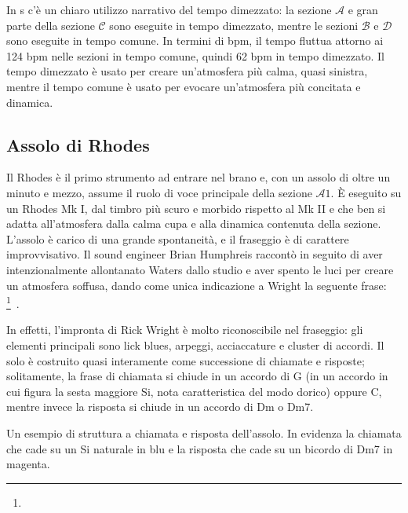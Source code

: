\documentclass[class=book, crop=false, oneside, 12pt]{standalone}
\begin{document}
    In \acrshort{s} c'è un chiaro utilizzo narrativo del tempo dimezzato: la sezione \(\mathcal{A}\) e gran parte della sezione \(\mathcal{C}\) sono eseguite in tempo dimezzato, mentre le sezioni \(\mathcal{B}\) e \(\mathcal{D}\) sono eseguite in tempo comune. In termini di bpm, il tempo fluttua attorno ai 124 bpm nelle sezioni in tempo comune, quindi 62 bpm in tempo dimezzato. Il tempo dimezzato è usato per creare un'atmosfera più calma, quasi sinistra, mentre il tempo comune è usato per evocare un'atmosfera più concitata e dinamica.


    \subsection{Assolo di Rhodes}
    Il Rhodes è il primo strumento ad entrare nel brano e, con un assolo di oltre un minuto e mezzo, assume il ruolo di voce principale della sezione \(\mathcal{A}1\). È eseguito su un Rhodes Mk I, dal timbro più scuro e morbido rispetto al Mk II e che ben si adatta all'atmosfera dalla calma cupa e alla dinamica contenuta della sezione. L'assolo è carico di una grande spontaneità, e il fraseggio è di carattere improvvisativo. Il sound engineer Brian Humphreis raccontò in seguito di aver intenzionalmente allontanato Waters dallo studio e aver spento le luci per creare un atmosfera soffusa, dando come unica indicazione a Wright la seguente frase: \footnote{}~\cite{easlea2022raving}.

    
    In effetti, l'impronta di Rick Wright è molto riconoscibile nel fraseggio: gli elementi principali sono lick blues, arpeggi, acciaccature e cluster di accordi. Il solo è costruito quasi interamente come successione di chiamate e risposte; solitamente, la frase di chiamata si chiude in un accordo di G (in un accordo in cui figura la sesta maggiore Si, nota caratteristica del modo dorico) oppure C, mentre invece la risposta si chiude in un accordo di Dm o Dm7.

    \begin{sheet}[htbp]
        \centering
        \caption[Un esempio di struttura a chiamata e risposta dell'assolo.]{Un esempio di struttura a chiamata e risposta dell'assolo. In evidenza la chiamata che cade su un Si naturale in blu e la risposta che cade su un bicordo di Dm7 in magenta.}
        \label{sheet:sheep-epiano_solo}
    \end{sheet}
\end{document}
